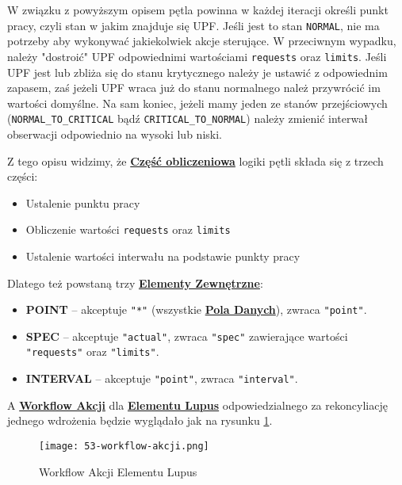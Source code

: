 W związku z powyższym opisem pętla powinna w każdej iteracji określi punkt pracy, czyli stan w jakim znajduje się UPF. Jeśli jest to stan \texttt{NORMAL}, nie ma potrzeby aby wykonywać jakiekolwiek akcje sterujące. W przeciwnym wypadku, należy "dostroić" UPF odpowiednimi wartościami \texttt{requests} oraz \texttt{limits}. Jeśli UPF jest lub zbliża się do stanu krytycznego należy je ustawić z odpowiednim zapasem, zaś jeżeli UPF wraca już do stanu normalnego należ przywrócić im wartości domyślne. Na sam koniec, jeżeli mamy jeden ze stanów przejściowych (\texttt{NORMAL\_TO\_CRITICAL} bądź \texttt{CRITICAL\_TO\_NORMAL}) należy zmienić interwał obserwacji odpowiednio na wysoki lub niski.

Z tego opisu widzimy, że \hyperlink{def:czesc-obliczeniowa}{\textbf{Część obliczeniowa}} logiki pętli składa się z trzech części:
\begin{itemize}
    \item Ustalenie punktu pracy 
    \item Obliczenie wartości \texttt{requests} oraz \texttt{limits}
    \item Ustalenie wartości interwału na podstawie punkty pracy
\end{itemize}

Dlatego też powstaną trzy \hyperlink{def:element-zewnetrzny}{\textbf{Elementy Zewnętrzne}}:
\begin{itemize}
    \item \textbf{POINT} – akceptuje \texttt{"*"} (wszystkie \hyperlink{def:pole-danych}{\textbf{Pola Danych}}), zwraca \texttt{"point"}.
    \item \textbf{SPEC} – akceptuje \texttt{"actual"}, zwraca \texttt{"spec"} zawierające wartości \texttt{"requests"} oraz \texttt{"limits"}.
    \item \textbf{INTERVAL} – akceptuje \texttt{"point"}, zwraca \texttt{"interval"}.
\end{itemize}

A \hyperlink{def:workflow-petli}{\textbf{Workflow Akcji}} dla \hyperlink{def:element-lupus}{\textbf{Elementu Lupus}} odpowiedzialnego za rekoncyliację jednego wdrożenia będzie wyglądało jak na rysunku \ref{fig:53-workflow-akcji}.

\begin{figure}[!h]
    \centering \texttt{[image: 53-workflow-akcji.png]}
    \caption{Workflow Akcji Elementu Lupus}\label{fig:53-workflow-akcji}
\end{figure}

